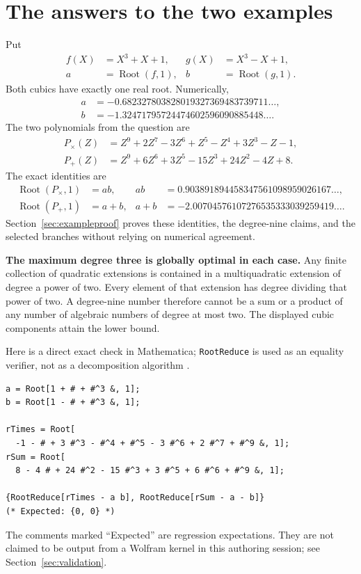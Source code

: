 \documentclass[11pt,a4paper]{article}
\newcommand{\code}[1]{\texttt{#1}}
\theoremstyle{definition}
\theoremstyle{remark}
\begin{document}
\section{The answers to the two examples}
\label{sec:examples}
Put
\begin{align*}
 f(X)&=X^3+X+1, & g(X)&=X^3-X+1,\\
 a&=\operatorname{Root}(f,1), & b&=\operatorname{Root}(g,1).
\end{align*}
Both cubics have exactly one real root. Numerically,
\begin{align*}
 a&=-0.682327803828019327369483739711\ldots,\\
 b&=-1.32471795724474602596090885448\ldots.
\end{align*}
The two polynomials from the question are
\begin{align}
 P_{\times}(Z)&=Z^9+2Z^7-3Z^6+Z^5-Z^4+3Z^3-Z-1,
 \label{eq:pt}\\
 P_+(Z)&=Z^9+6Z^6+3Z^5-15Z^3+24Z^2-4Z+8.
 \label{eq:ps}
\end{align}
The exact identities are
\begin{align}
 \operatorname{Root}(P_{\times},1)&=ab,
 &ab&=0.903891894458347561098959026167\ldots,\label{eq:answerp}\\
 \operatorname{Root}(P_+,1)&=a+b,
 &a+b&=-2.00704576107276535333039259419\ldots.\label{eq:answers}
\end{align}
Section~\ref{sec:exampleproof} proves these identities, the degree-nine claims, and the selected branches without relying on numerical agreement.

\textbf{The maximum degree three is globally optimal in each case.} Any finite collection of quadratic extensions is contained in a multiquadratic extension of degree a power of two. Every element of that extension has degree dividing that power of two. A degree-nine number therefore cannot be a sum or a product of any number of algebraic numbers of degree at most two. The displayed cubic components attain the lower bound.

Here is a direct exact check in Mathematica; \code{RootReduce} is used as an equality verifier, not as a decomposition algorithm \cite{rootreduce}.
\begin{lstlisting}
a = Root[1 + # + #^3 &, 1];
b = Root[1 - # + #^3 &, 1];

rTimes = Root[
  -1 - # + 3 #^3 - #^4 + #^5 - 3 #^6 + 2 #^7 + #^9 &, 1];
rSum = Root[
  8 - 4 # + 24 #^2 - 15 #^3 + 3 #^5 + 6 #^6 + #^9 &, 1];

{RootReduce[rTimes - a b], RootReduce[rSum - a - b]}
(* Expected: {0, 0} *)
\end{lstlisting}
The comments marked ``Expected'' are regression expectations. They are not claimed to be output from a Wolfram kernel in this authoring session; see Section~\ref{sec:validation}.
\end{document}
